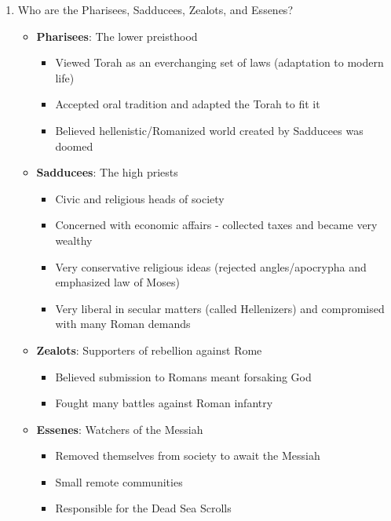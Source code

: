 \documentclass[8pt]{article}
\begin{document}
\begin{enumerate}
\newpage

        \item Who are the Pharisees, Sadducees, Zealots, and Essenes?
            \begin{itemize}
                \item \textbf{Pharisees}: The lower preisthood
                \begin{itemize}
                    \item Viewed Torah as an everchanging set of laws (adaptation to modern life)
                    \item Accepted oral tradition and adapted the Torah to fit it
                    \item Believed hellenistic/Romanized world created by Sadducees was doomed
                \end{itemize}
                \item \textbf{Sadducees}: The high priests
                \begin{itemize}
                    \item Civic and religious heads of society
                    \item Concerned with economic affairs - collected taxes and became very wealthy
                    \item Very conservative religious ideas (rejected angles/apocrypha and emphasized law of Moses)
                    \item Very liberal in secular matters (called Hellenizers) and compromised with many Roman demands
                \end{itemize}
                \item \textbf{Zealots}: Supporters of rebellion against Rome
                \begin{itemize}
                    \item Believed submission to Romans meant forsaking God
                    \item Fought many battles against Roman infantry
                \end{itemize}
                \item \textbf{Essenes}: Watchers of the Messiah
                \begin{itemize}
                    \item Removed themselves from society to await the Messiah
                    \item Small remote communities
                    \item Responsible for the Dead Sea Scrolls
                \end{itemize}
            \end{itemize}


\end{enumerate}
\end{document}
